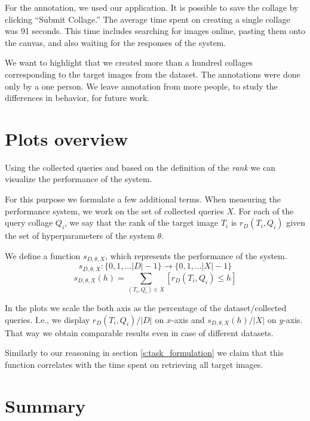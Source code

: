 For the annotation, we used our application. It is possible to save the collage by clicking ``Submit Collage.'' The average time spent on creating a single collage was 91 seconds. This time includes searching for images online, pasting them onto the canvas, and also waiting for the responses of the system.

We want to highlight that we created more than a hundred collages corresponding to the target images from the dataset. The annotations were done only by a one person. We leave annotation from more people, to study the differences in behavior, for future work. 

\section{Plots overview}

Using the collected queries and based on the definition of the \emph{rank} we can visualize the performance of the system.

For this purpose we formulate a few additional terms. When measuring the performance system, we work on the set of collected queries $X$. For each of the query collage $Q_i$, we say that the rank of the target image $T_i$ is $r_D(T_i, Q_i)$ given the set of hyperparameters of the system $\theta$.

We define a function $s_{D, \theta, X}$, which represents the performance of the system.
$$
s_{D, \theta, X}:\{0, 1, \ldots |D| - 1\} \rightarrow \{0, 1, \ldots |X| - 1\}
$$  
$$
s_{D, \theta, X}(h) = \sum_{(T_i, Q_i) \in X}[r_D(T_i, Q_i) \leq h]
$$

In the plots we scale the both axis as the percentage of the dataset/collected queries. I.e., we display $r_D(T_i, Q_i) / |D|$ on $x$-axis and $s_{D, \theta, X}(h) / |X|$ on $y$-axis. That way we obtain comparable results even in case of different datasets. 

Similarly to our reasoning in section \ref{s:task_formulation} we claim that this function correlates with the time spent on retrieving all target images.


\section{Summary}

